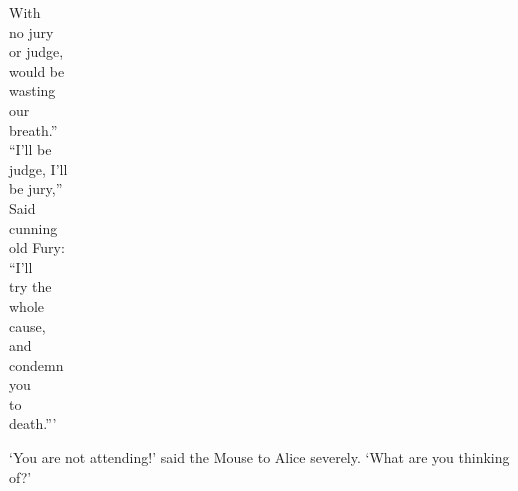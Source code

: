 \documentclass[12pt,openany]{memoir}
\renewenvironment{quote}%
  {\list{}{\leftmargin=2\parindent\rightmargin=0in}\item[]}%
  {\endlist}
\begin{document}
\begin{quote}
\fontsize{9pt}{10pt}\selectfont
\hspace*{5.2cm}         With\\
\hspace*{4.4cm}       no jury\\
\hspace*{3.6cm}     or judge,\\
\hspace*{3.2cm}    would be\\
\hspace*{2.8cm}   wasting\\
\hspace*{2.8cm}   our\\
\hspace*{2.8cm}   breath.''\\
\hspace*{3.6cm}     ``I'll be\\
\hspace*{3.6cm}     judge, I'll\\
\hspace*{4.0cm}      be jury,''\\
\hspace*{5.2cm}         Said\\
\hspace*{4.0cm}      cunning\\
\hspace*{4.4cm}       old Fury:\\
\hspace*{4.4cm}       ``I'll\\
\hspace*{4.4cm}       try the\\
\hspace*{5.2cm}         whole\\
\hspace*{5.2cm}         cause,\\
\hspace*{6.0cm}           and\\
\hspace*{4.8cm}        condemn\\
\hspace*{4.8cm}        you\\
\hspace*{4.4cm}       to\\
\hspace*{4.8cm}        death.'''
\end{quote}

\newpage

`You are not attending!' said the Mouse to Alice severely. `What are you thinking of?'
\end{document}
